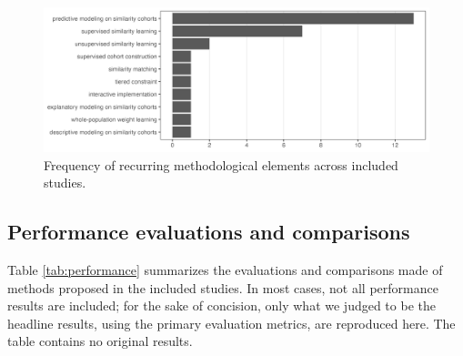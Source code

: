 \documentclass{article}
\begin{document}
\normalsize

\begin{figure}

{\centering \includegraphics[width=1\linewidth]{Fig4} 

}

\caption{Frequency of recurring methodological elements across included studies.}\label{fig:methods}
\end{figure}

\hypertarget{performance-evaluations-and-comparisons}{%
\subsection*{Performance evaluations and
comparisons}\label{performance-evaluations-and-comparisons}}

Table \ref{tab:performance} summarizes the evaluations and comparisons
made of methods proposed in the included studies. In most cases, not all
performance results are included; for the sake of concision, only what
we judged to be the headline results, using the primary evaluation
metrics, are reproduced here. The table contains no original results.
\end{document}
